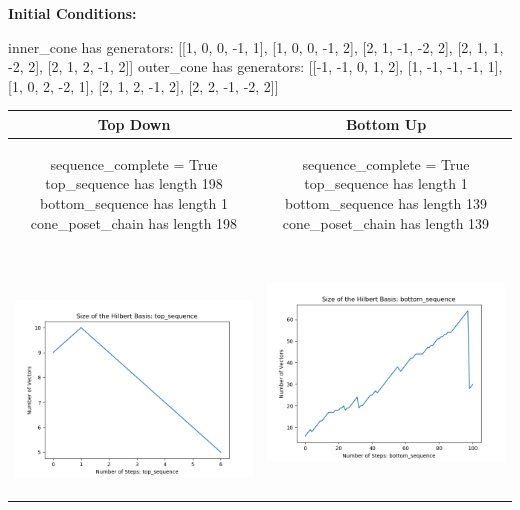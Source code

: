 \documentclass[10pt]{article}
\begin{document}
\textbf{Initial Conditions:}
\begin{SAGE}
inner_cone has generators: 
[[1, 0, 0, -1, 1], [1, 0, 0, -1, 2], [2, 1, -1, -2, 2], [2, 1, 1, -2, 2], [2, 1, 2, -1, 2]]
outer_cone has generators: 
[[-1, -1, 0, 1, 2], [1, -1, -1, -1, 1], [1, 0, 2, -2, 1], [2, 1, 2, -1, 2], [2, 2, -1, -2, 2]]

\end{SAGE}
\begin{tabular}{c|c}
\textbf{Top Down} & \textbf{Bottom Up} \\ \hline  
\begin{SAGE}
	sequence_complete = True
	top_sequence has length 198
	bottom_sequence has length 1
	cone_poset_chain has length 198
\end{SAGE} 
&
\begin{SAGE}
	sequence_complete = True
	top_sequence has length 1
	bottom_sequence has length 139
	cone_poset_chain has length 139
\end{SAGE} 
\\ \hline
\
\begin{minipage}{.45\textwidth}
\includegraphics[width=\textwidth]{"DATA/5d/5 generators 2 bound B/top_sequence SIZE"}
\end{minipage} &
\begin{minipage}{.45\textwidth}
\includegraphics[width=\textwidth]{"DATA/5d/5 generators 2 bound B bottomup/bottom_sequence SIZE"}

\end{minipage}
\end{tabular}
\end{document}
